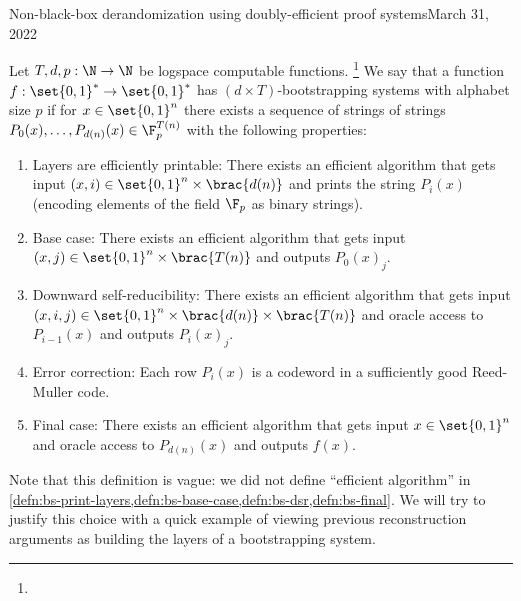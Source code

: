 \begin{lecture}{10}{Non-black-box derandomization using doubly-efficient proof
  systems}{March 31, 2022}
\begin{definition}
  Let $T, d, p : \N \to \N$ be logspace computable functions.%
  \footnote{}
  We say that a function $f : \set{0, 1}^* \to \set{0, 1}^*$ has
  $(d \times T)$-bootstrapping systems with alphabet size $p$ if for
  $x \in \set{0, 1}^n$ there exists a sequence of strings of strings
  $P_0(x), \ldots , P_{d(n)}(x) \in \F_p^{T(n)}$ with the following properties:
  \begin{enumerate}
    \item Layers are efficiently printable: There exists an efficient algorithm
      that gets input $(x, i) \in \set{0, 1}^n \times \brac{d(n)}$ and prints
      the string $P_i(x)$ (encoding elements of the field $\F_p$ as binary
      strings).%
      \label{defn:bs-print-layers}
    \item Base case: There exists an efficient algorithm that gets input
      $(x, j) \in \set{0, 1}^n \times \brac{T(n)}$ and outputs ${P_0(x)}_j$.%
      \label{defn:bs-base-case}
    \item Downward self-reducibility: There exists an efficient algorithm that
      gets input
      $(x, i, j) \in \set{0, 1}^n \times \brac{d(n)} \times \brac{T(n)}$ and
      oracle access to $P_{i - 1}(x)$ and outputs ${P_i(x)}_j$.%
      \label{defn:bs-dsr}
    \item Error correction: Each row $P_i(x)$ is a codeword in a sufficiently
      good Reed-Muller code.
    \item Final case: There exists an efficient algorithm that gets input
      $x \in \set{0, 1}^n$ and oracle access to $P_{d(n)}(x)$ and outputs
      $f(x)$.%
      \label{defn:bs-final}
  \end{enumerate}
\end{definition}

Note that this definition is vague: we did not define ``efficient algorithm''
in \cref{defn:bs-print-layers,defn:bs-base-case,defn:bs-dsr,defn:bs-final}.
We will try to justify this choice with a quick example of viewing previous
reconstruction arguments as building the layers of a bootstrapping system.


\end{lecture}
